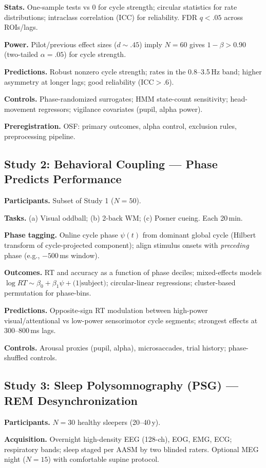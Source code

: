 \documentclass{article}
\begin{document}
\textbf{Stats.} One-sample tests vs 0 for cycle strength; circular statistics for rate distributions; intraclass correlation (ICC) for reliability. FDR $q{<}.05$ across ROIs/lags.

\textbf{Power.} Pilot/previous effect sizes ($d{\sim}.45$) imply $N{=}60$ gives $1{-}\beta{>}0.90$ (two-tailed $\alpha{=}.05$) for cycle strength.

\textbf{Predictions.} Robust nonzero cycle strength; rates in the 0.8--3.5\,Hz band; higher asymmetry at longer lags; good reliability (ICC$>.6$).

\textbf{Controls.} Phase-randomized surrogates; HMM state-count sensitivity; head-movement regressors; vigilance covariates (pupil, alpha power).

\textbf{Preregistration.} OSF: primary outcomes, alpha control, exclusion rules, preprocessing pipeline.

\subsection{Study 2: Behavioral Coupling --- Phase Predicts Performance}
\textbf{Participants.} Subset of Study 1 ($N{=}50$).

\textbf{Tasks.} (a) Visual oddball; (b) 2-back WM; (c) Posner cueing. Each 20\,min.

\textbf{Phase tagging.} Online cycle phase $\psi(t)$ from dominant global cycle (Hilbert transform of cycle-projected component); align stimulus onsets with \emph{preceding} phase (e.g., $-500$\,ms window).

\textbf{Outcomes.} RT and accuracy as a function of phase deciles; mixed-effects models $\log RT{\sim}\beta_0{+}\beta_1\psi{+}\text{(1|subject)}$; circular-linear regressions; cluster-based permutation for phase-bins.

\textbf{Predictions.} Opposite-sign RT modulation between high-power visual/attentional vs low-power sensorimotor cycle segments; strongest effects at 300--800\,ms lags.

\textbf{Controls.} Arousal proxies (pupil, alpha), microsaccades, trial history; phase-shuffled controls.

\subsection{Study 3: Sleep Polysomnography (PSG) --- REM Desynchronization}
\textbf{Participants.} $N{=}30$ healthy sleepers (20--40\,y).

\textbf{Acquisition.} Overnight high-density EEG (128-ch), EOG, EMG, ECG; respiratory bands; sleep staged per AASM by two blinded raters. Optional MEG night ($N{=}15$) with comfortable supine protocol.
\end{document}
